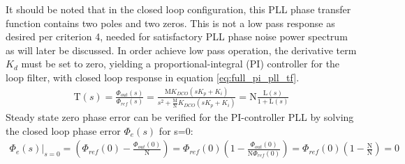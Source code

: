 	It should be noted that in the closed loop configuration, this PLL phase transfer function contains two poles and two zeros. This is not a low pass response as desired per criterion 4, needed for satisfactory PLL phase noise power spectrum as will later be discussed. In order achieve low pass operation, the derivative term $K_d$ must be set to zero, yielding a proportional-integral (PI) controller for the loop filter, with closed loop response in equation \ref{eq:full_pi_pll_tf}.
	\begin{align} \label{eq:full_pi_pll_tf}
		\mathrm{T}(s) = \frac{\Phi_{out}(s)}{\Phi_{ref}(s)} = \frac{\mathrm{M}K_{DCO}\left(sK_p + K_i\right)}{s^2 + \frac{\mathrm{M}}{\mathrm{N}}K_{DCO}\left(sK_p + K_i\right)} = \mathrm{N}\frac{\mathrm{L}(s)}{1 + \mathrm{L}(s)} 
	\end{align}
	Steady state zero phase error can be verified for the PI-controller PLL by solving the closed loop phase error $\Phi_e(s)$ for s=0:
	\begin{align}
		\left.\Phi_e(s)\right\vert_{s=0} = \left(\Phi_{ref}(0) - \frac{\Phi_{out}(0)}{\mathrm{N}}\right) = \Phi_{ref}(0)\left(1 - \frac{\Phi_{out}(0)}{\mathrm{N}\Phi_{ref}(0)}\right)= \Phi_{ref}(0)\left(1 - \frac{\mathrm{N}}{\mathrm{N}}\right) = 0
	\end{align}

